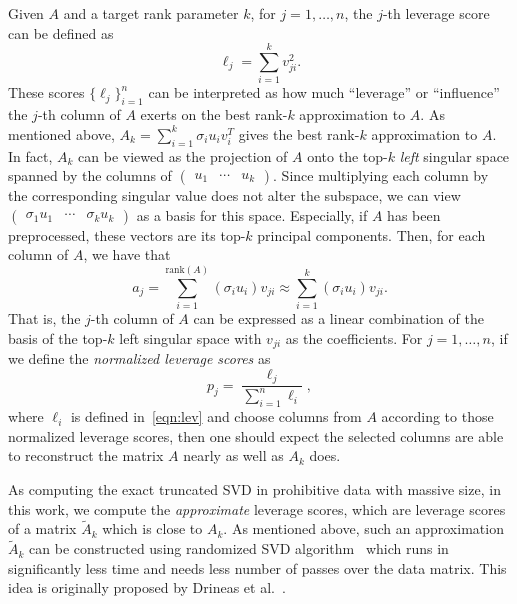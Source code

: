 Given $A$ and a target rank parameter $k$, for $j=1,\ldots,n$, the $j$-th leverage score can be defined as
\begin{equation}
 \label{eqn:lev}
  \ell_j = \sum_{i=1}^k v_{ji}^2.
\end{equation}
These scores $\{\ell_j\}_{i=1}^{n}$ can be interpreted as how much ``leverage'' or ``influence'' the $j$-th column of $A$ exerts on the best rank-$k$ approximation to $A$. 
As mentioned above, $A_k = \sum_{i=1}^k \sigma_i u_i v_i^T$ gives the best rank-$k$ approximation to $A$.
In fact, $A_k$ can be viewed as the projection of $A$ onto the top-$k$ \emph{left} singular space spanned by the columns of $\begin{pmatrix} u_1 & \cdots & u_k \end{pmatrix}$.
Since multiplying each column by the corresponding singular value does not alter the subspace, we can view
$\begin{pmatrix} \sigma_1 u_1 & \cdots & \sigma_k u_k \end{pmatrix}$ as a basis for this space.  
Especially, if $A$ has been preprocessed, these vectors are its top-$k$ principal components.
Then, for each column of $A$, we have that
  $$  a_j = \sum_{i=1}^{\text{rank}(A)} (\sigma_i u_i) v_{ji} \approx \sum_{i=1}^k (\sigma_i u_i) v_{ji}.  $$
That is, the $j$-th column of $A$ can be expressed as a linear combination of the basis of the top-$k$ left singular space with $v_{ji}$ as the coefficients.
For $j=1,\ldots,n$, if we define the {\it normalized leverage scores} as
\begin{equation}
\label{eqn:nlev}
  p_j = \frac{\ell_j}{\sum_{i=1}^n \ell_i},
\end{equation}      
where $\ell_i$ is defined in~\eqref{eqn:lev} and choose columns from $A$ according to those normalized leverage scores, then one should expect
the selected columns are able to reconstruct the matrix $A$ nearly as well as $A_k$ does.

As computing the exact truncated SVD in prohibitive data with massive size, 
in this work, we compute the {\it approximate} leverage scores, which are leverage scores of a matrix $\tilde A_k$ which is close to $A_k$. As mentioned above, such an approximation $\tilde A_k$ can be constructed using randomized SVD algorithm~\cite{HMT09_SIREV} which runs in significantly less time and needs less number of passes over the data matrix. This idea is originally proposed by Drineas et al.~\cite{DMMW12_JMLR}. 

